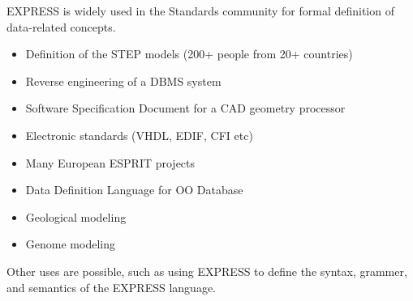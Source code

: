 %


\begin{remarks}
\remintro


    EXPRESS is widely used in the Standards community for formal definition
of data-related concepts.

\remend
\end{remarks}



\begin{itemize}
\item Definition of the STEP models
      (200+ people from 20+ countries)
\item Reverse engineering of a DBMS system
\item Software Specification Document for a CAD geometry processor
\item Electronic standards (VHDL, EDIF, CFI etc)
\item Many European ESPRIT projects
\item Data Definition Language for OO Database
\item Geological modeling
\item Genome modeling
\end{itemize}

    Other uses are possible, such as using EXPRESS to define the syntax, 
grammer, and semantics of the EXPRESS language.

